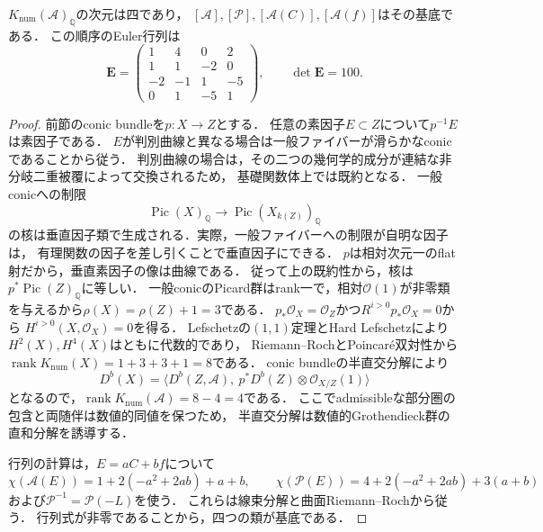 \begin{lemma}\label{lem:numerical-rank-four}
$K_{\mathrm{num}}(\mathcal A)_{\mathbb Q}$の次元は四であり，
$[\mathcal A],[\mathcal P],[\mathcal A(C)],[\mathcal A(f)]$はその基底である．
この順序のEuler行列は
\[
 \mathbf E=\begin{pmatrix}
 1&4&0&2\\
 1&1&-2&0\\
 -2&-1&1&-5\\
 0&1&-5&1
 \end{pmatrix},\qquad\det\mathbf E=100.
\]
\end{lemma}
\begin{proof}
前節のconic bundleを$p:X\to Z$とする．
任意の素因子$E\subset Z$について$p^{-1}E$は素因子である．
$E$が判別曲線と異なる場合は一般ファイバーが滑らかなconicであることから従う．
判別曲線の場合は，その二つの幾何学的成分が連結な非分岐二重被覆によって交換されるため，
基礎関数体上では既約となる．
一般conicへの制限
\[
 \operatorname{Pic}(X)_{\mathbb Q}\longrightarrow
 \operatorname{Pic}(X_{k(Z)})_{\mathbb Q}
\]
の核は垂直因子類で生成される．実際，一般ファイバーへの制限が自明な因子は，
有理関数の因子を差し引くことで垂直因子にできる．
$p$は相対次元一のflat射だから，垂直素因子の像は曲線である．
従って上の既約性から，核は$p^*\operatorname{Pic}(Z)_{\mathbb Q}$に等しい．
一般conicのPicard群はrank一で，相対$\mathcal O(1)$が非零類を与えるから$\rho(X)=\rho(Z)+1=3$である．
$p_*\mathcal O_X=\mathcal O_Z$かつ$R^{i>0}p_*\mathcal O_X=0$から
$H^{i>0}(X,\mathcal O_X)=0$を得る．
Lefschetzの$(1,1)$定理とHard Lefschetzにより$H^2(X),H^4(X)$はともに代数的であり，
Riemann--RochとPoincar\'e双対性から$\operatorname{rank}K_{\mathrm{num}}(X)=1+3+3+1=8$である．
conic bundleの半直交分解\cite[Theorem~4.2]{KuznetsovQuadric}により
\[
 D^b(X)=\langle D^b(Z,\mathcal A),\ p^*D^b(Z)\otimes\mathcal O_{X/Z}(1)\rangle
\]
となるので，$\operatorname{rank}K_{\mathrm{num}}(\mathcal A)=8-4=4$である．
ここでadmissibleな部分圏の包含と両随伴は数値的同値を保つため，
半直交分解は数値的Grothendieck群の直和分解を誘導する．

行列の計算は，$E=aC+bf$について
\[
 \chi(\mathcal A(E))=1+2(-a^2+2ab)+a+b,
 \qquad
 \chi(\mathcal P(E))=4+2(-a^2+2ab)+3(a+b)
\]
および$\mathcal P^{-1}=\mathcal P(-L)$を使う．
これらは線束分解と曲面Riemann--Rochから従う．
行列式が非零であることから，四つの類が基底である．
\end{proof}

